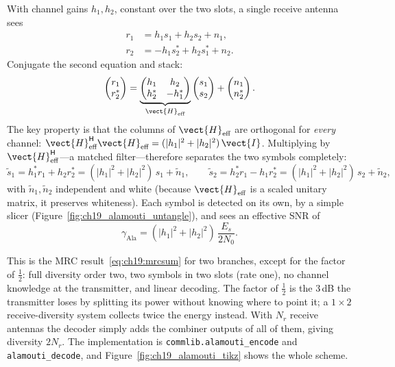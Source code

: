 With channel gains $h_1,h_2$, constant over the two slots, a single receive antenna sees
\begin{align}
r_1&=h_1s_1+h_2s_2+n_1,\\
r_2&=-h_1s_2^*+h_2s_1^*+n_2.
\end{align}
Conjugate the second equation and stack:
\begin{equation}
\begin{pmatrix}r_1\\ r_2^*\end{pmatrix}=
\underbrace{\begin{pmatrix}h_1 & h_2\\ h_2^* & -h_1^*\end{pmatrix}}_{\vect{H}_{\text{eff}}}
\begin{pmatrix}s_1\\ s_2\end{pmatrix}+\begin{pmatrix}n_1\\ n_2^*\end{pmatrix}.
\label{eq:ch19:alaeff}
\end{equation}
The key property is that the columns of $\vect{H}_{\text{eff}}$ are orthogonal for \emph{every}
channel:
$\vect{H}_{\text{eff}}^{\mathsf H}\vect{H}_{\text{eff}}=(|h_1|^2+|h_2|^2)\,\vect{I}$. Multiplying by
$\vect{H}_{\text{eff}}^{\mathsf H}$---a matched filter---therefore separates the two symbols
completely:
\begin{equation}
\tilde s_1=h_1^*r_1+h_2r_2^*=(|h_1|^2+|h_2|^2)\,s_1+\tilde n_1,\qquad
\tilde s_2=h_2^*r_1-h_1r_2^*=(|h_1|^2+|h_2|^2)\,s_2+\tilde n_2,
\label{eq:ch19:aladec}
\end{equation}
with $\tilde n_1,\tilde n_2$ independent and white (because $\vect{H}_{\text{eff}}$ is a scaled
unitary matrix, it preserves whiteness). Each symbol is detected on its own, by a simple slicer
(Figure~\ref{fig:ch19_alamouti_untangle}), and sees an effective SNR of
\begin{equation}
\gamma_{\text{Ala}}=(|h_1|^2+|h_2|^2)\,\frac{E_s}{2N_0}.
\end{equation}

This is the MRC result~\eqref{eq:ch19:mrcsum} for two branches, except for the factor of
$\tfrac12$: full diversity order two, two symbols in two slots (rate one), no channel knowledge at
the transmitter, and linear decoding. The factor of $\tfrac12$ is the 3\,dB the transmitter loses by
splitting its power without knowing where to point it; a $1\times2$ receive-diversity system
collects twice the energy instead. With $N_r$ receive antennas the decoder simply adds the
combiner outputs of all of them, giving diversity $2N_r$. The implementation is
\texttt{commlib.alamouti\_encode} and \texttt{alamouti\_decode}, and Figure~\ref{fig:ch19_alamouti_tikz}
shows the whole scheme.

